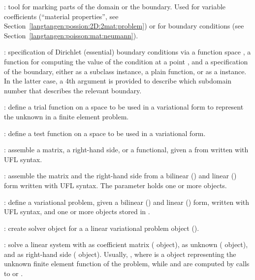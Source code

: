 \begin{trivlist}
  \item[\emp{MeshFunction}:] tool for marking parts of the domain or
  the boundary.  Used for variable coefficients (``material properties'',
  see Section~\ref{langtangen:possion:2D:2mat:problem}) or for boundary
  conditions (see Section~\ref{langtangen:poisson:mat:neumann}).

  \item[\emp{DirichletBC(V, value, where)}:] specification of Dirichlet
  (essential) boundary conditions via a function space , a
  function  for computing the value of the condition at
  a point , and a specification  of the boundary,
  either as a  subclass instance, a plain function, or
  as a  instance.  In the latter case, a 4th argument
  is provided to describe which subdomain number that describes the
  relevant boundary.

  \item[\emp{TrialFunction(V)}:] define a trial function on a space
   to be used in a variational form to represent the unknown in
  a finite element problem.

  \item[\emp{TestFunction(V)}:] define a test function on a space 
  to be used in a variational form.

  \item[\emp{assemble(X)}:] assemble a matrix, a right-hand side, or a
  functional, given a from  written with UFL syntax.

  \item[\emp{assemble\_system(a, L, bcs)}:] assemble the matrix and the
  right-hand side from a bilinear () and linear () form
  written with UFL syntax. The  parameter holds one or more
   objects.

  \item[\emp{LinearVariationalProblem(a, L, u, bcs)}:]
  define a variational problem,
  given a bilinear () and linear () form, written with UFL
  syntax, and one or more  objects stored in .

  \item[\emp{LinearVariationalSolver(problem)}:] create solver object for
  a a linear variational problem object ().

  \item[\emp{solve(A, U, b)}:] solve a linear system with 
  as coefficient matrix ( object),  as unknown
  ( object), and  as right-hand side (
  object).  Usually, , where
   is a  object representing the unknown finite
  element function of the problem, while  and  are computed
  by calls to  or .


\end{trivlist}
